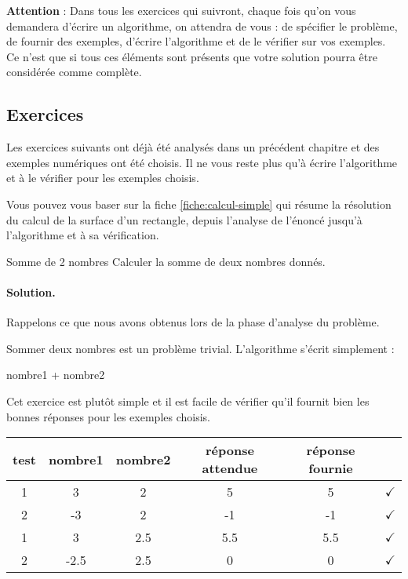 			\bigskip
			\textbf{Attention} : 
			Dans tous les exercices qui suivront,
			chaque fois qu'on vous demandera d'écrire un algorithme,
			on attendra de vous : de spécifier le problème,
			de fournir des exemples, d'écrire l'algorithme
			et de le vérifier sur vos exemples.
			Ce n'est que si tous ces éléments sont présents
			que votre solution pourra être considérée comme complète.

		\subsection{Exercices}\label{prem-ex-simple}

			Les exercices suivants ont déjà été analysés 
			dans un précédent chapitre
			et des exemples numériques ont été choisis.
			Il ne vous reste plus qu'à écrire l'algorithme
			et à le vérifier pour les exemples choisis.

			Vous pouvez vous baser sur la fiche \vref{fiche:calcul-simple} 
			qui résume la résolution 
			du calcul de la surface d'un rectangle,
			depuis l'analyse de l'énoncé jusqu'à l'algorithme
			et à sa vérification.
	
			\begin{Exercice}{Somme de 2 nombres}
				Calculer la somme de deux nombres donnés.
				\paragraph{Solution.}
				Rappelons ce que nous avons obtenus 
				lors de la phase d'analyse du problème.
				\begin{center}
				\end{center}
				Sommer deux nombres est un problème trivial.
				L'algorithme s'écrit simplement :			
				\begin{LDA}
						\Return nombre1 + nombre2
					\EndAlgo
				\end{LDA}
				Cet exercice est plutôt simple 
				et il est facile de vérifier qu'il fournit
				bien les bonnes réponses pour les exemples choisis.				
				\begin{center}
					\begin{tabular}{|c|cccc|c|}
					\hline
					test \no & nombre1 & nombre2 & réponse attendue & réponse fournie & {} \\\hline
					\hline 
					1 & 3    & 2   & 5   & 5   & {\color{ForestGreen}$\checkmark$} \\\hline
					2 & -3   & 2   & -1  & -1  & {\color{ForestGreen}$\checkmark$} \\\hline
					1 & 3    & 2.5 & 5.5 & 5.5 & {\color{ForestGreen}$\checkmark$} \\\hline
					2 & -2.5 & 2.5 & 0   & 0   & {\color{ForestGreen}$\checkmark$} \\\hline
					\end{tabular}
				\end{center}				
			\end{Exercice}
		

